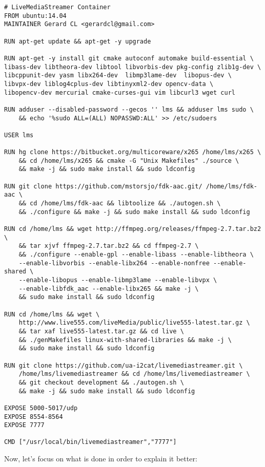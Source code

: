 \begin{verbatim}
# LiveMediaStreamer Container
FROM ubuntu:14.04
MAINTAINER Gerard CL <gerardcl@gmail.com>

RUN apt-get update && apt-get -y upgrade

RUN apt-get -y install git cmake autoconf automake build-essential \ 
libass-dev libtheora-dev libtool libvorbis-dev pkg-config zlib1g-dev \
libcppunit-dev yasm libx264-dev  libmp3lame-dev  libopus-dev \
libvpx-dev liblog4cplus-dev libtinyxml2-dev opencv-data \
libopencv-dev mercurial cmake-curses-gui vim libcurl3 wget curl 

RUN adduser --disabled-password --gecos '' lms && adduser lms sudo \
	&& echo '%sudo ALL=(ALL) NOPASSWD:ALL' >> /etc/sudoers

USER lms

RUN hg clone https://bitbucket.org/multicoreware/x265 /home/lms/x265 \
	&& cd /home/lms/x265 && cmake -G "Unix Makefiles" ./source \
	&& make -j && sudo make install && sudo ldconfig

RUN git clone https://github.com/mstorsjo/fdk-aac.git/ /home/lms/fdk-aac \
	&& cd /home/lms/fdk-aac && libtoolize && ./autogen.sh \
	&& ./configure && make -j && sudo make install && sudo ldconfig

RUN cd /home/lms && wget http://ffmpeg.org/releases/ffmpeg-2.7.tar.bz2 \
	&& tar xjvf ffmpeg-2.7.tar.bz2 && cd ffmpeg-2.7 \
	&& ./configure --enable-gpl --enable-libass --enable-libtheora \
	--enable-libvorbis --enable-libx264 --enable-nonfree --enable-shared \
	--enable-libopus --enable-libmp3lame --enable-libvpx \
	--enable-libfdk_aac --enable-libx265 && make -j \
	&& sudo make install && sudo ldconfig

RUN cd /home/lms && wget \
	http://www.live555.com/liveMedia/public/live555-latest.tar.gz \
	&& tar xaf live555-latest.tar.gz && cd live \
	&& ./genMakefiles linux-with-shared-libraries && make -j \
	&& sudo make install && sudo ldconfig

RUN git clone https://github.com/ua-i2cat/livemediastreamer.git \
	/home/lms/livemediastreamer && cd /home/lms/livemediastreamer \
	&& git checkout development && ./autogen.sh \
	&& make -j && sudo make install && sudo ldconfig

EXPOSE 5000-5017/udp
EXPOSE 8554-8564
EXPOSE 7777

CMD ["/usr/local/bin/livemediastreamer","7777"] 
\end{verbatim}

Now, let's focus on what is done in order to explain it better: 

